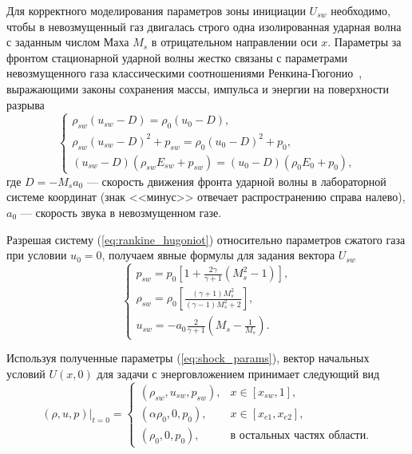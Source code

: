 \documentclass[a4paper,14pt]{extarticle}
\theoremstyle{theorem}
\theoremstyle{lemma}
\begin{document}
Для корректного моделирования параметров зоны инициации $U_{sw}$ необходимо, чтобы в невозмущенный газ двигалась строго одна изолированная ударная волна с заданным числом Маха $M_s$ в отрицательном направлении оси $x$. Параметры за фронтом стационарной ударной волны жестко связаны с параметрами невозмущенного газа классическими соотношениями Ренкина-Гюгонио~\cite{landau}, выражающими законы сохранения массы, импульса и энергии на поверхности разрыва
\begin{equation}
\label{eq:rankine_hugoniot}
\begin{cases}
    \rho_{sw} (u_{sw} - D) = \rho_0 (u_0 - D), \\
    \rho_{sw} (u_{sw} - D)^2 + p_{sw} = \rho_0 (u_0 - D)^2 + p_0, \\
    (u_{sw} - D)\left( \rho_{sw} E_{sw} + p_{sw} \right) = (u_0 - D)\left( \rho_0 E_0 + p_0 \right),
\end{cases}
\end{equation}
где $D = -M_s a_0$ — скорость движения фронта ударной волны в лабораторной системе координат (знак <<минус>> отвечает распространению справа налево), $a_0$ — скорость звука в невозмущенном газе. 

Разрешая систему (\ref{eq:rankine_hugoniot}) относительно параметров сжатого газа при условии $u_0 = 0$, получаем явные формулы для задания вектора $U_{sw}$
\begin{equation}
\label{eq:shock_params}
\begin{cases}
    \displaystyle p_{sw} = p_0 \left[ 1 + \frac{2\gamma}{\gamma + 1}(M_s^2 - 1) \right], \\[10pt]
    \displaystyle \rho_{sw} = \rho_0 \left[ \frac{(\gamma + 1) M_s^2}{(\gamma - 1) M_s^2 + 2} \right], \\[10pt]
    \displaystyle u_{sw} = -a_0 \frac{2}{\gamma + 1} \left( M_s - \frac{1}{M_s} \right).
\end{cases}
\end{equation}

Используя полученные параметры (\ref{eq:shock_params}), вектор начальных условий $U(x, 0)$ для задачи с энерговложением принимает следующий вид
\begin{equation}
\label{eq:initial_energy}
(\rho, u, p)\big|_{t=0} = 
\begin{cases} 
(\rho_{sw}, u_{sw}, p_{sw}), & x \in [x_{sw}, 1], \\
(\alpha \rho_0, 0, p_0), & x \in [x_{e1}, x_{e2}], \\
(\rho_0, 0, p_0), & \text{в остальных частях области.}
\end{cases}
\end{equation}
\end{document}
